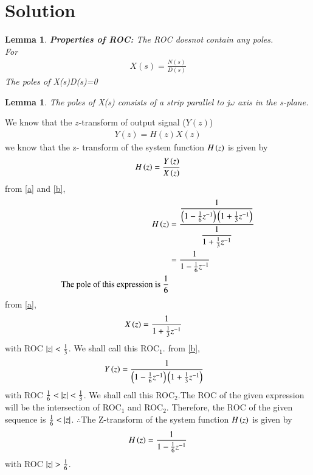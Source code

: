 \documentclass[journal,12pt,twocolumn]{IEEEtran}
\newtheorem{lemma}[theorem]{Lemma}
\begin{document}
\section{Solution}
\begin{lemma}{\textbf{Properties of ROC:}}
The ROC doesnot contain any poles.\\
For
\begin{align}
    X(s)=\frac{N(s)}{D(s)}
\end{align}
The poles of X(s)\implies D(s)=0
\end{lemma}
\begin{lemma}
 The poles of X(s) consists of a strip parallel to j$\omega$ axis in the s-plane.
\end{lemma}
We know that the $z$-transform of output signal ($Y(z)$)
\begin{align}
    Y(z)=H(z)X(z)
\end{align}
we know that the z- transform of the system function $H\left(z\right)$ is given by 
\begin{align}
H\left(z\right) = \dfrac{Y\left(z\right)}{X\left(z\right)}
\end{align}
from \eqref{a} and \eqref{b},
\begin{align}
H\left(z\right) &= \dfrac{\dfrac{1}{\left(1- \frac{1}{6}z^{-1}\right)\left(1+ \frac{1}{3}z^{-1}\right)}}{\dfrac{1}{1+ \frac{1}{3}z^{-1}}}\\
&=\dfrac{1}{1- \frac{1}{6}z^{-1}}\\
\text{The pole of this expression is $\frac{1}{6}$}
\end{align}
from \eqref{a},
\begin{align}
 X\left(z\right) &= \dfrac{1}{1+ \frac{1}{3}z^{-1}}
\end{align}
with ROC $\vert z\vert < \frac{1}{3}$. We shall call this ROC$_1$.
from \eqref{b},
\begin{align}
Y\left(z\right) &= \dfrac{1}{\left(1- \frac{1}{6}z^{-1}\right)\left(1+ \frac{1}{3}z^{-1}\right)}
\end{align}
with ROC $\frac{1}{6} < \vert z\vert < \frac{1}{3}$. We shall call this ROC$_2$.The ROC of the given expression will be the intersection of ROC$_1$ and ROC$_2$. Therefore, the ROC of the given sequence is $\frac{1}{6} < \vert z\vert$.
$\therefore$The Z-transform of the system function $H\left(z\right)$ is given by 
 \begin{align}
H\left(z\right) =\dfrac{1}{1- \frac{1}{6}z^{-1}}
\end{align}
with ROC $ \vert z\vert > \frac{1}{6}  $.
%
\end{document}
